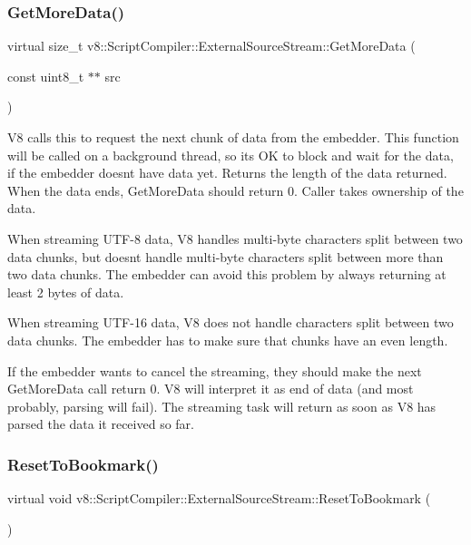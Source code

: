 \subsubsection{\texorpdfstring{Get\+More\+Data()}{GetMoreData()}}
{\footnotesize\ttfamily virtual size\+\_\+t v8\+::\+Script\+Compiler\+::\+External\+Source\+Stream\+::\+Get\+More\+Data (\begin{DoxyParamCaption}\item[{const uint8\+\_\+t $\ast$$\ast$}]{src }\end{DoxyParamCaption})\hspace{0.3cm}{\ttfamily [pure virtual]}}

V8 calls this to request the next chunk of data from the embedder. This function will be called on a background thread, so it\textquotesingle{}s OK to block and wait for the data, if the embedder doesn\textquotesingle{}t have data yet. Returns the length of the data returned. When the data ends, Get\+More\+Data should return 0. Caller takes ownership of the data.

When streaming U\+T\+F-\/8 data, V8 handles multi-\/byte characters split between two data chunks, but doesn\textquotesingle{}t handle multi-\/byte characters split between more than two data chunks. The embedder can avoid this problem by always returning at least 2 bytes of data.

When streaming U\+T\+F-\/16 data, V8 does not handle characters split between two data chunks. The embedder has to make sure that chunks have an even length.

If the embedder wants to cancel the streaming, they should make the next Get\+More\+Data call return 0. V8 will interpret it as end of data (and most probably, parsing will fail). The streaming task will return as soon as V8 has parsed the data it received so far. \mbox{\label{classv8_1_1ScriptCompiler_1_1ExternalSourceStream_a425cf1ba265eeca194b805fe5c52bc19}} 
\subsubsection{\texorpdfstring{Reset\+To\+Bookmark()}{ResetToBookmark()}}
{\footnotesize\ttfamily virtual void v8\+::\+Script\+Compiler\+::\+External\+Source\+Stream\+::\+Reset\+To\+Bookmark (\begin{DoxyParamCaption}{ }\end{DoxyParamCaption})\hspace{0.3cm}{\ttfamily [virtual]}}

